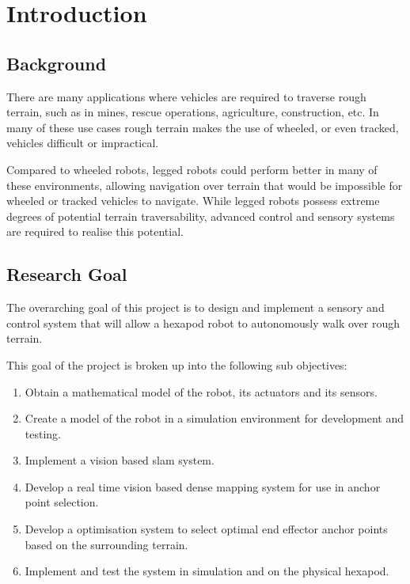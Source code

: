 \chapter{Introduction}

\section{Background}

    There are many applications where vehicles are required to traverse rough terrain, such as in mines, rescue operations, agriculture, construction, etc. In many of these
    use cases rough terrain makes the use of wheeled, or even tracked, vehicles difficult or impractical.

    Compared to wheeled robots, legged robots could perform better in many of these environments, allowing navigation over terrain that would be impossible for wheeled or
    tracked vehicles to navigate. While legged robots possess extreme degrees of potential terrain traversability, advanced control and sensory systems are required to 
    realise this potential.


\section{Research Goal}
    The overarching goal of this project is to design and implement a sensory and control system that will allow a hexapod robot to autonomously walk over rough terrain.

    This goal of the project is broken up into the following sub objectives:

    \begin{enumerate}
        \item Obtain a mathematical model of the robot, its actuators and its sensors.
        \item Create a model of the robot in a simulation environment for development and testing.
        \item Implement a vision based \ac{slam} system.
        \item Develop a real time vision based dense mapping system for use in anchor point selection.
        \item Develop a optimisation system to select optimal end effector anchor points based on the surrounding terrain.
        \item Implement and test the system in simulation and on the physical hexapod.
    \end{enumerate}


